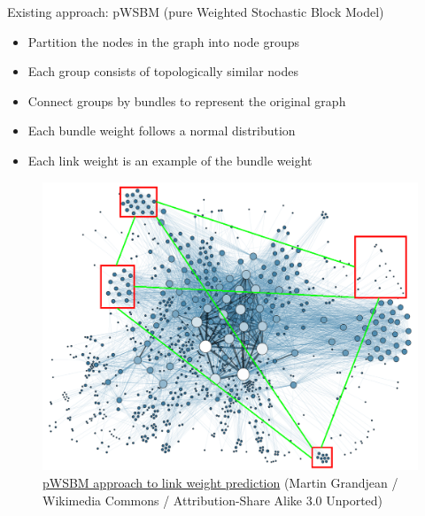 \documentclass{beamer}
\begin{document}
\begin{frame}{Existing approach: pWSBM (pure Weighted Stochastic Block Model)}
	\begin{itemize}
		\item Partition the nodes in the graph into node groups
		\item Each group consists of topologically similar nodes
		\item Connect groups by bundles to represent the original graph
		\item Each bundle weight follows a normal distribution
		\item Each link weight is an example of the bundle weight
	\end{itemize}
	\begin{figure}[H]
		\centering
		\includegraphics[width=0.4\linewidth]{SBM}
		\caption{ \href{https://commons.wikimedia.org/wiki/File:Social_Network_Analysis_Visualization.png}{pWSBM approach to link weight prediction} (Martin Grandjean / Wikimedia Commons / Attribution-Share Alike 3.0 Unported)}
		\label{fig:SBM}
	\end{figure}
\end{frame}
\end{document}
